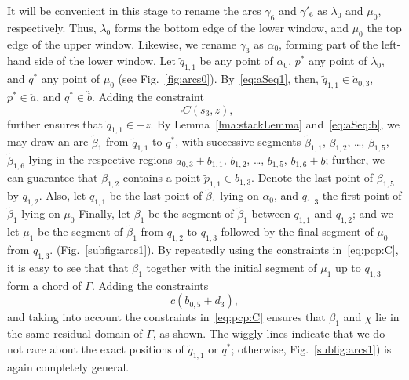 \documentclass{article}
\newcommand{\intermediate}[1]{\dot{#1}}
\newcommand{\inner}[1]{\ddot{#1}}
\begin{document}
It will be convenient in this stage to rename the arcs $\gamma_6$ and
$\gamma'_6$ as $\lambda_0$ and $\mu_0$, respectively.  Thus,
$\lambda_0$ forms the bottom edge of the lower window, and $\mu_0$ the
top edge of the upper window. Likewise, we rename $\gamma_3$ as
$\alpha_0$, forming part of the left-hand side of the lower
window. Let $\tilde{q}_{1,1}$ be any point of $\alpha_0$, $p^*$ any
point of $\lambda_0$, and $q^*$ any point of $\mu_0$ (see
Fig.~\ref{fig:arcs0}).  By~\eqref{eq:aSeq1}, then, $\tilde{q}_{1,1}
\in \intermediate{a}_{0,3}$, $p^* \in \inner{a}$, and $q^* \in
\inner{b}$.  Adding the constraint
\begin{equation*}
\neg C(s_3,z),
\end{equation*}
further ensures that $\tilde{q}_{1,1} \in -z$.  By
Lemma~\ref{lma:stackLemma} and~\eqref{eq:aSeq:b}, we may draw an arc
$\tilde{\beta}_1$ from $\tilde{q}_{1,1}$ to $q^*$, with successive
segments $\tilde{\beta}_{1,1}$, $\beta_{1,2}$, \ldots, $\beta_{1,5}$,
$\tilde{\beta}_{1,6}$ lying in the respective regions $a_{0,3} +
b_{1,1}$, $b_{1,2}$, \dots, $b_{1,5}$, $b_{1,6} + b$; further, we can
guarantee that $\beta_{1,2}$ contains a point $\tilde{p}_{1,1} \in
\intermediate{b}_{1,3}$.  Denote the last point of $\beta_{1,5}$ by
$q_{1,2}$. Also, let $q_{1,1}$ be the last point of $\tilde{\beta}_1$
lying on $\alpha_0$, and $q_{1,3}$ the first point of
$\tilde{\beta}_1$ lying on $\mu_0$ Finally, let $\beta_1$ be the
segment of $\tilde{\beta}_1$ between $q_{1,1}$ and $q_{1,2}$; and we
let $\mu_1$ be the segment of $\tilde{\beta}_1$ from $q_{1,2}$ to
$q_{1,3}$ followed by the final segment of $\mu_0$ from $q_{1,3}$.
(Fig.~\ref{subfig:arcs1}).  By repeatedly using the constraints
in~\eqref{eq:pcp:C}, it is easy to see that that $\beta_1$ together
with the initial segment of $\mu_1$ up to $q_{1,3}$ form a chord of
$\Gamma$. Adding the constraints
\begin{equation*}
c(b_{0,5} + d_3),
\end{equation*}
and taking into account the constraints in~\eqref{eq:pcp:C} ensures
that $\beta_1$ and $\chi$ lie in the same residual domain of $\Gamma$,
as shown.  The wiggly lines indicate that we do not care about the
exact positions of $\tilde{q}_{1,1}$ or $q^*$; otherwise,
Fig.~\ref{subfig:arcs1}) is again completely general.
\end{document}
